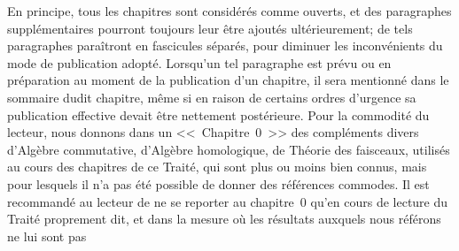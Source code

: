 En principe, tous les chapitres sont considérés comme ouverts, et des paragraphes supplémentaires pourront toujours leur être ajoutés ultérieurement; de tels paragraphes paraîtront en fascicules séparés, pour diminuer les inconvénients du mode de publication adopté.
Lorsqu'un tel paragraphe est prévu ou en préparation au moment de la publication d'un chapitre, il sera mentionné dans le sommaire dudit chapitre, même si en raison de certains ordres d'urgence sa publication effective devait être nettement postérieure.
Pour la commodité du lecteur, nous donnons dans un <<~Chapitre~0~>> des compléments divers d'Algèbre commutative, d'Algèbre homologique, de Théorie des faisceaux, utilisés au cours des chapitres de ce Traité, qui sont plus ou moins bien connus, mais pour lesquels il n'a pas été possible de donner des références commodes.
Il est recommandé au lecteur de ne se reporter au chapitre~0 qu'en cours de lecture du Traité proprement dit, et dans la mesure où les résultats auxquels nous référons ne lui sont pas

